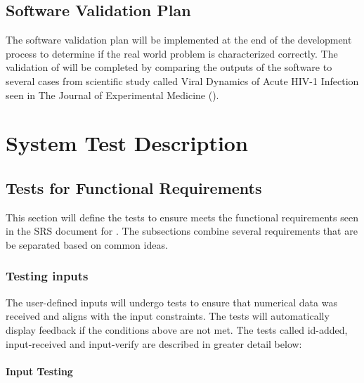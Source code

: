 \documentclass[12pt, titlepage]{article}
\begin{document}
\newpage

\subsection{Software Validation Plan}

The software validation plan will be implemented at the end of the development 
process to determine if the real world problem is characterized correctly. The 
validation of \progname{} will be completed by comparing the outputs of the 
software to several cases from scientific study called Viral Dynamics of Acute 
HIV-1 Infection seen in The Journal of Experimental Medicine 
(\citet{viraldynamics}).

\section{System Test Description}
	
\subsection{Tests for Functional Requirements}

This section will define the tests to ensure \progname{} meets the functional 
requirements seen in the SRS document for \progname{}. The subsections combine 
several requirements that are be separated based on common ideas.

\subsubsection{Testing inputs}

The user-defined inputs will undergo tests to ensure that numerical data was 
received and aligns with the input constraints. The tests will automatically 
display feedback if the conditions above are not met. The tests called 
id-added, input-received and input-verify are described in greater detail below: 

\paragraph{Input Testing}
\end{document}
